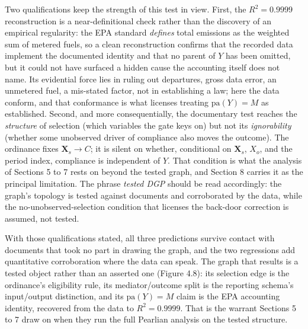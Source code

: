 Two qualifications keep the strength of this test in view. First, the $R^2 = 0.9999$ reconstruction is a near-definitional check rather than the discovery of an empirical regularity: the EPA standard \emph{defines} total emissions as the weighted sum of metered fuels, so a clean reconstruction confirms that the recorded data implement the documented identity and that no parent of $Y$ has been omitted, but it could not have surfaced a hidden cause the accounting itself does not name. Its evidential force lies in ruling out departures, gross data error, an unmetered fuel, a mis-stated factor, not in establishing a law; here the data conform, and that conformance is what licenses treating $\mathrm{pa}(Y) = M$ as established. Second, and more consequentially, the documentary test reaches the \emph{structure} of selection (which variables the gate keys on) but not its \emph{ignorability} (whether some unobserved driver of compliance also moves the outcome). The ordinance fixes $\mathbf{X}_s \to C$; it is silent on whether, conditional on $\mathbf{X}_s$, $X_o$, and the period index, compliance is independent of $Y$. That condition is what the analysis of Sections 5 to 7 rests on beyond the tested graph, and Section 8 carries it as the principal limitation. The phrase \emph{tested DGP} should be read accordingly: the graph's topology is tested against documents and corroborated by the data, while the no-unobserved-selection condition that licenses the back-door correction is assumed, not tested.

With those qualifications stated, all three predictions survive contact with documents that took no part in drawing the graph, and the two regressions add quantitative corroboration where the data can speak. The graph that results is a tested object rather than an asserted one (Figure 4.8): its selection edge is the ordinance's eligibility rule, its mediator/outcome split is the reporting schema's input/output distinction, and its $\mathrm{pa}(Y) = M$ claim is the EPA accounting identity, recovered from the data to $R^2 = 0.9999$. That is the warrant Sections 5 to 7 draw on when they run the full Pearlian analysis on the tested structure.


